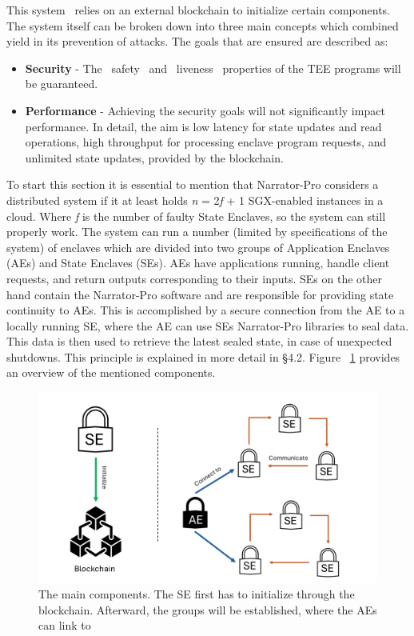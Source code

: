  

This system~\cite{esccc} relies on an external blockchain to initialize certain components. The system itself can be broken down into three main concepts which combined yield in its prevention of attacks. The goals that are ensured are described as:
\begin{itemize}
     \item \textbf{Security} - The ~safety~ and ~liveness~ properties of the TEE programs will be guaranteed.
     \item \textbf{Performance} - Achieving the security goals will not significantly impact performance. In detail, the aim is low latency for state updates and read operations, high throughput for processing enclave program requests, and unlimited state updates, provided by the blockchain.
\end{itemize} 
To start this section it is essential to mention that Narrator-Pro considers a distributed system if it at least holds \textit{n} = 2\textit{f} + 1 SGX-enabled instances in a cloud. Where \textit{f} is the number of faulty State Enclaves, so the system can still properly work. The system can run a number (limited by specifications of the system) of enclaves which are divided into two groups of Application Enclaves (AEs) and State Enclaves (SEs). AEs have applications running, handle client requests, and return outputs corresponding to their inputs. SEs on the other hand contain the Narrator-Pro software and are responsible for providing state continuity to AEs. This is accomplished by a secure connection from the AE to a locally running SE, where the AE can use SEs Narrator-Pro libraries to seal data. This data is then used to retrieve the latest sealed state, in case of unexpected shutdowns. This principle is explained in more detail in §4.2. Figure ~\ref{fig:1} provides an overview of the mentioned components.

\begin{figure}[h]
    \centering
    \includegraphics[width=\linewidth]{Figures/Figure1.png}
    \caption{The main components. The SE first has to initialize through the blockchain. Afterward, the groups will be established, where the AEs can link to}
    \label{fig:1}
\end{figure}


